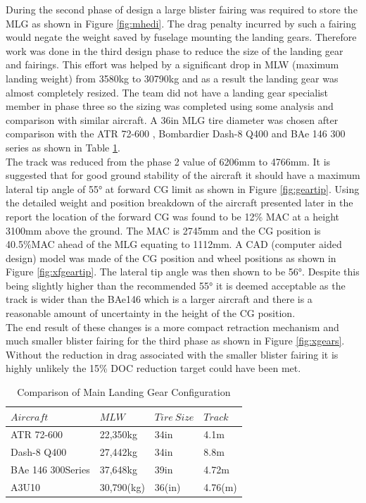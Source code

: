 \documentclass[11pt]{article}
\newcommand{\ra}[1]{\renewcommand{\arraystretch}{#1}}
\begin{document}
During the second phase of design a large blister fairing was required to store the MLG as shown in Figure \ref{fig:mhedi}. The drag penalty incurred by such a fairing would negate the weight saved by fuselage mounting the landing gears. Therefore work was done in the third design phase to reduce the size of the landing gear and fairings. This effort was helped by a significant drop in MLW (maximum landing weight) from 3580kg to 30790kg and as a result the landing gear was almost completely resized. The team did not have a landing gear specialist member in phase three so the sizing was completed using some analysis and comparison with similar aircraft. A 36in MLG tire diameter was chosen after comparison with the ATR 72-600 \cite{jane}, Bombardier Dash-8  Q400 \cite{q400} and BAe 146 300 series \cite{bae146} as shown in Table \ref{table:MLG}. \\
 The track was reduced from the phase 2 value of 6206mm to 4766mm. It is suggested that for good ground stability of the aircraft it should have a maximum lateral tip angle of \ang{55} at forward CG limit \cite{GAPP} as shown in Figure \ref{fig:geartip}. Using the detailed weight and position breakdown of the aircraft presented later in the report the location of the forward CG was found to be 12\% MAC at a height 3100mm above the ground. The MAC is 2745mm and the CG position is 40.5\%MAC ahead of the MLG equating to 1112mm. A CAD (computer aided design) model was made of the CG position and wheel positions as shown in Figure \ref{fig:xfgeartip}. The lateral tip angle was then shown to be \ang{56}. Despite this being slightly higher than the recommended \ang{55} it is deemed acceptable as the track is wider than the BAe146 which is a larger aircraft and there is a reasonable amount of uncertainty in the height of the CG position.\\
The end result of these changes is a more compact retraction mechanism and much smaller blister fairing for the third phase as shown in Figure \ref{fig:xgears}. Without the reduction in drag associated with the smaller blister fairing it is highly unlikely the 15\% DOC reduction target could have been met.


\FloatBarrier
\begin{table}[!h]
\centering %
\ra{1.3}
\begin{tabular}{@{}llll@{}}\toprule
$Aircraft$ & $MLW$ & $Tire \ Size$ & $Track$ \\
\midrule
ATR 72-600 & 22,350kg & 34in  & 4.1m\\
Dash-8 Q400 & 27,442kg & 34in & 8.8m \\ 
BAe 146 300Series & 37,648kg & 39in & 4.72m \\
\midrule
 A3U10 & 30,790(kg) &  36(in)& 4.76(m)\\
\bottomrule
\end{tabular}
\caption{Comparison of Main Landing Gear Configuration}
\label{table:MLG}
\end{table}
\end{document}
